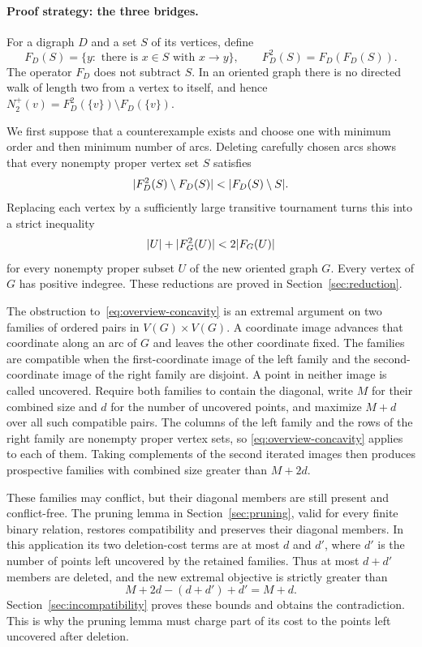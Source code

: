 \paragraph{Proof strategy: the three bridges.}
For a digraph \(D\) and a set \(S\) of its vertices, define
\[
 F_D(S)=\{y:\text{ there is }x\in S\text{ with }x\to y\},
 \qquad F_D^2(S)=F_D(F_D(S)).
\]
The operator \(F_D\) does not subtract \(S\).  In an oriented graph there is
no directed walk of length two from a vertex to itself, and hence
\(N_2^+(v)=F_D^2(\{v\})\setminus F_D(\{v\})\).

We first suppose that a counterexample exists and choose one with minimum
order and then minimum number of arcs.  Deleting carefully chosen arcs
shows that every nonempty proper vertex set \(S\) satisfies
\[
 \lvert F_D^2(S)\setminus F_D(S)\rvert
 <
 \lvert F_D(S)\setminus S\rvert.
\]
Replacing each vertex by a sufficiently large transitive tournament turns
this into a strict inequality
\begin{equation}\label{eq:overview-concavity}
 \lvert U\rvert+\lvert F_G^2(U)\rvert<2\lvert F_G(U)\rvert
\end{equation}
for every nonempty proper subset \(U\) of the new oriented graph \(G\).
Every vertex of \(G\) has positive indegree.  These reductions are proved in
Section~\ref{sec:reduction}.

The obstruction to~\eqref{eq:overview-concavity} is an extremal argument
on two families of ordered pairs in $V(G)\times V(G)$.  A coordinate image
advances that coordinate along an arc of $G$ and leaves the other coordinate
fixed.  The families are compatible when the first-coordinate image of the left family and the
second-coordinate image of the right family are disjoint.  A point in
neither image is called uncovered.  Require both families to contain the
diagonal, write $M$ for their combined size and $d$ for the number of
uncovered points, and maximize $M+d$ over all such compatible pairs.
The columns of the left family and the rows of the right family are
nonempty proper vertex sets, so
\eqref{eq:overview-concavity} applies to each of them.  Taking complements
of the second iterated images then produces prospective families with
combined size greater than $M+2d$.

These families may conflict, but their diagonal members are still present
and conflict-free.  The pruning lemma in
Section~\ref{sec:pruning}, valid for every finite binary relation,
restores compatibility and preserves their diagonal members.
In this application its two deletion-cost terms are at most $d$ and $d'$,
where $d'$ is the number of points left uncovered by the retained families.
Thus at most $d+d'$ members are deleted, and the new extremal objective is
strictly greater than
\[
 M+2d-(d+d')+d'=M+d.
\]
Section~\ref{sec:incompatibility} proves these bounds and obtains the
contradiction.  This is why the pruning lemma must charge part of its
cost to the points left uncovered after deletion.

